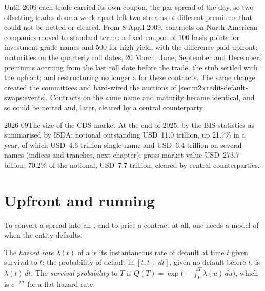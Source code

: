 Until 2009 each trade carried its own coupon, the par spread of the day, so two
offsetting trades done a week apart left two streams of different premiums that
could not be netted or cleared. From 8 April 2009, contracts on North American
companies moved to standard terms: a fixed coupon of 100 basis points for
investment-grade names and 500 for high yield, with the difference paid upfront;
maturities on the quarterly roll dates, 20 March, June, September and December;
premiums accruing from the last roll date before the trade, the stub settled with the
upfront; and restructuring no longer a  for these contracts. The same change created
the committees and hard-wired the auctions of \cref{sec:m2:credit-default-swaps:events}.
Contracts on the same name and maturity became identical, and so could be netted
and, later, cleared by a central counterparty.

\begin{dated}{2026-09}{The size of the CDS market}\label{dat:m2:credit-default-swaps:size}
At the end of 2025, by the BIS statistics as summarised by ISDA: notional outstanding
USD~11.0 trillion, up 21.7\% in a year, of which USD~4.6 trillion single-name and
USD~6.4 trillion on several names (indices and tranches, next chapter); gross market
value USD~273.7 billion; 70.2\% of the notional, USD~7.7 trillion, cleared by central
counterparties.
\end{dated}

\section{Upfront and running}

To convert a spread into an , and to price a contract at all, one
needs a model of when the entity defaults.

\begin{definition}\label{def:m2:credit-default-swaps:hazard}
The \emph{hazard rate} $\lambda(t)$ of a  is its
instantaneous rate of default at time $t$ given survival to $t$: the probability of
default in $[t, t + dt]$, given no default before $t$, is $\lambda(t)\,dt$. The
\emph{survival probability} to $T$ is $Q(T) =
\exp\bigl(-\int_0^T \lambda(u)\,du\bigr)$, which is $e^{-\lambda T}$ for a flat hazard
rate.
\end{definition}

